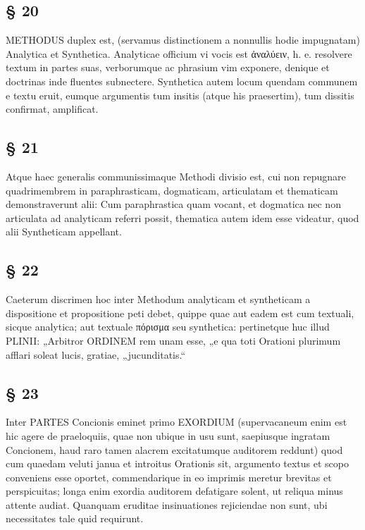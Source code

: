 \subsection{§ 20}

METHODUS duplex est, (servamus distinctionem a nonnullis hodie impugnatam) Analytica et Synthetica. Analyticae officium vi vocis est ἀναλύειν, h. e. resolvere textum in partes suas, verborumque ac phrasium vim exponere, denique et doctrinas inde fluentes subnectere. Synthetica autem locum quendam communem e textu eruit, eumque argumentis tum insitis (atque his praesertim), tum dissitis confirmat, amplificat.

\subsection{§ 21}

Atque haec generalis communissimaque Methodi divisio est, cui non repugnare quadrimembrem in paraphrasticam, dogmaticam, articulatam et thematicam demonstraverunt alii: Cum paraphrastica quam vocant, et dogmatica nec non articulata ad analyticam referri possit, thematica autem idem esse videatur, quod alii Syntheticam appellant.

\subsection{§ 22}

Caeterum discrimen hoc inter Methodum analyticam et syntheticam a dispositione et propositione peti debet, quippe quae aut eadem est cum textuali, sicque analytica; aut textuale πόρισμα seu synthetica: pertinetque huc illud PLINII: „Arbitror ORDINEM rem unam esse, „e qua toti Orationi plurimum afflari soleat lucis, gratiae, „jucunditatis.“

\subsection{§ 23}

Inter PARTES Concionis eminet primo EXORDIUM (supervacaneum enim est hic agere de praeloquiis, quae non ubique in usu sunt, saepiusque ingratam Concionem, haud raro tamen alacrem excitatumque auditorem reddunt) quod cum quaedam veluti janua et introitus Orationis sit, argumento textus et scopo conveniens esse oportet, commendarique in eo imprimis meretur brevitas et perspicuitas; longa enim exordia auditorem defatigare solent, ut reliqua minus attente audiat. Quanquam eruditae insinuationes rejiciendae non sunt, ubi necessitates tale quid requirunt.

